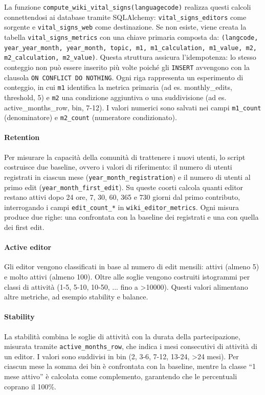 La funzione \texttt{compute\_wiki\_vital\_signs(languagecode)} realizza questi calcoli connettendosi ai database tramite SQLAlchemy: 
\texttt{vital\_signs\_editors} come sorgente e \texttt{vital\_signs\_web} come destinazione. 
Se non esiste, viene creata la tabella \texttt{vital\_signs\_metrics} con una chiave primaria composta da: 
\texttt{(langcode, year\_year\_month, year\_month, topic, m1, m1\_calculation, m1\_value, m2, \\m2\_calculation, m2\_value)}. Questa struttura assicura l’idempotenza: lo stesso conteggio non può essere inserito più volte poiché gli \texttt{INSERT} avvengono con la clausola \texttt{ON CONFLICT DO NOTHING}. 
Ogni riga rappresenta un esperimento di conteggio, in cui \texttt{m1} identifica la metrica primaria (ad es. monthly\_edits, threshold, 5) e \texttt{m2} una condizione aggiuntiva o una suddivisione (ad es. active\_months\_row, bin, 7-12). I valori numerici sono salvati nei campi \texttt{m1\_count} (denominatore) e \texttt{m2\_count} (numeratore condizionato).

\paragraph{Retention}  
Per misurare la capacità della comunità di trattenere i nuovi utenti, lo script costruisce due baseline, ovvero i valori di riferimento: il numero di utenti registrati in ciascun mese (\texttt{year\_month\allowbreak\_registration}) e il numero di utenti al primo edit (\texttt{year\_month\_first\_edit}). 
Su queste coorti calcola quanti editor restano attivi dopo 24 ore, 7, 30, 60, 365 e 730 giorni dal primo contributo, interrogando i campi \texttt{edit\_count\_*} in \texttt{wiki\_editor\_metrics}. 
Ogni misura produce due righe: una confrontata con la baseline dei registrati e una con quella dei first edit.

\paragraph{Active editor}  
Gli editor vengono classificati in base al numero di edit mensili: attivi (almeno 5) e molto attivi (almeno 100). 
Oltre alle soglie vengono costruiti istogrammi per classi di attività (1-5, 5-10, 10-50, ... fino a \textgreater 10000). 
Questi valori alimentano altre metriche, ad esempio stability e balance.

\paragraph{Stability}  
La stabilità combina le soglie di attività con la durata della partecipazione, misurata tramite \texttt{active\_months\_row}, che indica i mesi consecutivi di attività di un editor. 
I valori sono suddivisi in bin (2, 3-6, 7-12, 13-24, \textgreater 24 mesi). 
Per ciascun mese la somma dei bin è confrontata con la baseline, mentre la classe ``1 mese attivo'' è calcolata come complemento, garantendo che le percentuali coprano il 100\%.


